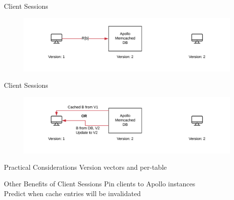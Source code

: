 \documentclass[10pt]{beamer}
\begin{document}
\begin{frame}[fragile]{Client Sessions}
    \begin{figure}
        \includegraphics[scale=0.17]{apollo_client_sessions_8}
    \end{figure}
\end{frame}

\begin{frame}[fragile]{Client Sessions}
    \begin{figure}
        \includegraphics[scale=0.17]{apollo_client_sessions_9}
    \end{figure}
\end{frame}

\begin{frame}[fragile]{Practical Considerations}
    Version vectors and per-table
\end{frame}

\begin{frame}[fragile]{Other Benefits of Client Sessions}
    Pin clients to Apollo instances\\
    Predict when cache entries will be invalidated
\end{frame}

\begin{frame}[allowframebreaks]
    
    
\end{frame}
\end{document}

